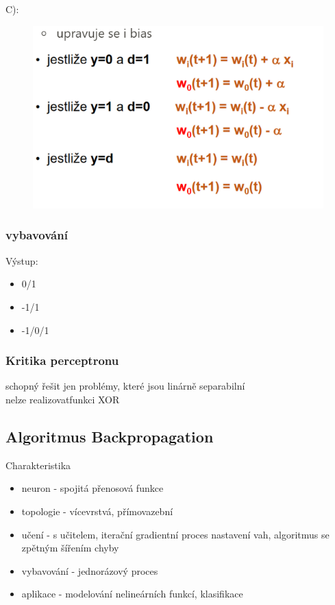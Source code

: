 C):
\begin{figure}[H]
    \includegraphics[scale = 1]{images/perceptron_vahy3.png}
\end{figure}

\subsubsection*{vybavování}
Výstup:
\begin{itemize}
    \item 0/1
    \item -1/1
    \item -1/0/1
\end{itemize}
\subsubsection*{Kritika perceptronu}
schopný řešit jen problémy, které jsou linárně separabilní\\
nelze realizovatfunkci XOR

\subsection*{Algoritmus Backpropagation}
Charakteristika
\begin{itemize}
    \item neuron - spojitá přenosová funkce
    \item topologie - vícevrstvá, přímovazební
    \item učení - s učitelem, iterační gradientní proces nastavení vah, algoritmus se zpětným šířením chyby
    \item vybavování - jednorázový proces
    \item aplikace - modelování nelineárních funkcí, klasifikace
\end{itemize}

